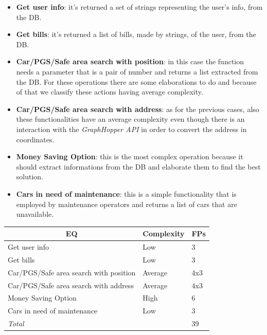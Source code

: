 \documentclass[english]{article}
\begin{document}
\begin{itemize}
	\item{\textbf{Get user info}: it's returned a set of strings representing the user's info, from the DB.}

	\item{\textbf{Get bills}: it's returned a list of bills, made by strings, of the user, from the DB.}

	\item{\textbf{Car/PGS/Safe area search with position}: in this case the function needs a parameter that is a pair of number and returns a list extracted from the DB. For these operations there are some elaborations to do and because of that we classify these actions having average complexity.}

	\item{\textbf{Car/PGS/Safe area search with address}: as for the previous cases, also these functionalities have an average complexity even though there is an interaction with the \textit{GraphHopper API} in order to convert the address in coordinates.}

	\item{\textbf{Money Saving Option}: this is the most complex operation because it should extract informations from the DB and elaborate them to find the best solution.}

	\item{\textbf{Cars in need of maintenance}: this is a simple functionality that is employed by maintenance operators and returns a list of cars that are unavailable.}
\end{itemize}


\begin{center}
	\begin{tabular}{ |p{8cm}|m{2cm}|p{1cm}| }
		\hline
		\multicolumn{1}{|c|}{\textbf{EQ}} & \multicolumn{1}{c|}{\textbf{Complexity}} & \multicolumn{1}{c|}{\textbf{FPs}} \\
		\hline
		Get user info & Low & 3 \\
		\hline
		Get bills & Low & 3\\
		\hline
		Car/PGS/Safe area search with position & Average & 4x3\\
		\hline
		Car/PGS/Safe area search with address & Average & 4x3\\
		\hline
		Money Saving Option & High & 6\\
		\hline
		Cars in need of maintenance & Low & 3 \\
		\hline
		\multicolumn{2}{|l|}{\textit{Total}} & \multicolumn{1}{l|}{39}\\
		\hline
	\end{tabular}
\end{center}
\end{document}

